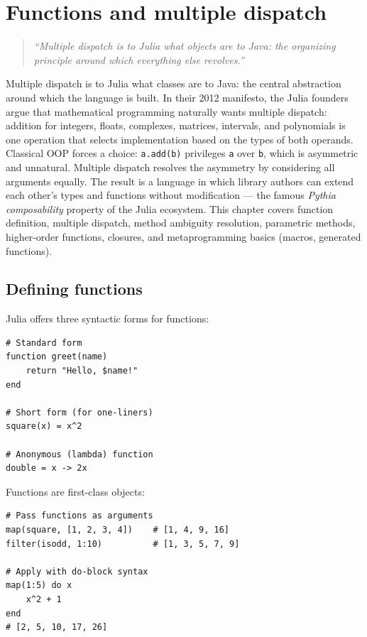 \chapter{Functions and multiple dispatch}
\label{ch:functions-dispatch}

\begin{quote}
\emph{``Multiple dispatch is to Julia what objects are to Java: the organizing principle around which everything else revolves.''}
\end{quote}

Multiple dispatch is to Julia what classes are to Java: the central abstraction around which the language is built. In their 2012 manifesto, the Julia founders argue that mathematical programming naturally wants multiple dispatch: addition for integers, floats, complexes, matrices, intervals, and polynomials is one operation that selects implementation based on the types of both operands. Classical OOP forces a choice: \texttt{a.add(b)} privileges \texttt{a} over \texttt{b}, which is asymmetric and unnatural. Multiple dispatch resolves the asymmetry by considering all arguments equally. The result is a language in which library authors can extend each other's types and functions without modification --- the famous \emph{Pythia composability} property of the Julia ecosystem. This chapter covers function definition, multiple dispatch, method ambiguity resolution, parametric methods, higher-order functions, closures, and metaprogramming basics (macros, generated functions).

\section{Defining functions}

Julia offers three syntactic forms for functions:

\begin{verbatim}
# Standard form
function greet(name)
    return "Hello, $name!"
end

# Short form (for one-liners)
square(x) = x^2

# Anonymous (lambda) function
double = x -> 2x
\end{verbatim}

Functions are first-class objects:
\begin{verbatim}
# Pass functions as arguments
map(square, [1, 2, 3, 4])    # [1, 4, 9, 16]
filter(isodd, 1:10)          # [1, 3, 5, 7, 9]

# Apply with do-block syntax
map(1:5) do x
    x^2 + 1
end
# [2, 5, 10, 17, 26]
\end{verbatim}

